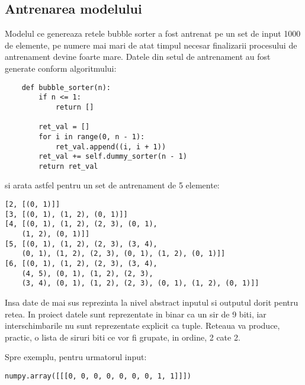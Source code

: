\documentclass[12pt]{article}
\begin{document}
\subsection{Antrenarea modelului}

Modelul ce genereaza retele bubble sorter a fost antrenat pe un set de input 1000 de elemente, pe numere mai mari de atat timpul necesar finalizarii procesului de antrenament devine foarte mare. Datele din setul de antrenament au fost generate conform algoritmului:
\begin{lstlisting}
    def bubble_sorter(n):
        if n <= 1:
            return []

        ret_val = []
        for i in range(0, n - 1):
            ret_val.append((i, i + 1))
        ret_val += self.dummy_sorter(n - 1)
        return ret_val
\end{lstlisting}

si arata astfel pentru un set de antrenament de 5 elemente:

\begin{lstlisting}
[2, [(0, 1)]]
[3, [(0, 1), (1, 2), (0, 1)]]
[4, [(0, 1), (1, 2), (2, 3), (0, 1), 
	(1, 2), (0, 1)]]
[5, [(0, 1), (1, 2), (2, 3), (3, 4), 
	(0, 1), (1, 2), (2, 3), (0, 1), (1, 2), (0, 1)]]
[6, [(0, 1), (1, 2), (2, 3), (3, 4), 
	(4, 5), (0, 1), (1, 2), (2, 3), 
	(3, 4), (0, 1), (1, 2), (2, 3), (0, 1), (1, 2), (0, 1)]]
\end{lstlisting}

Insa date de mai sus reprezinta la nivel abstract inputul si outputul dorit pentru retea. In proiect datele sunt reprezentate in binar ca un sir de 9 biti, iar interschimbarile nu sunt reprezentate explicit ca tuple. Reteaua va produce, practic, o lista de siruri biti ce vor fi grupate, in ordine, 2 cate 2.

Spre exemplu, pentru urmatorul input:

\begin{lstlisting}
numpy.array([[[0, 0, 0, 0, 0, 0, 0, 1, 1]]])
\end{lstlisting}
\end{document}
